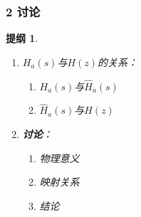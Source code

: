 \documentclass[notheorems,compress,mathserif,table]{beamer}
\newtheorem{jytg}{提纲}
\begin{document}
%
%
\begin{frame}[shrink]\frametitle{2 讨论}%
\begin{jytg}
\begin{enumerate}
    \item [1] $H_a(s)$与$H(z)$的关系：
        \begin{enumerate}
            \item [(1)]  $H_a(s)$与$\hat{H}_a(s)$
            \item [(2)] $\hat{H}_a(s)$与$H(z)$
        \end{enumerate}
    \item [2] \textbf{讨论}：
        \begin{enumerate}
            \item [(1)] 物理意义
            \item [(2)] 映射关系
            \item [(3)] 结论
        \end{enumerate}
\end{enumerate}
\end{jytg}

\end{frame}
%
%
%
\end{document}
